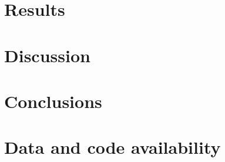 \documentclass[preprint,12pt]{elsarticle}
\begin{document}
\section{Results}
\label{sec:results}

\section{Discussion}
\label{sec:discussion}

\section{Conclusions}
\label{sec:conclusions}

\section*{Data and code availability}



\end{document}
